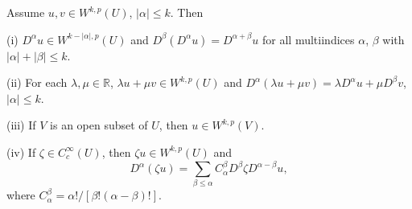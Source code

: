 \begin{theorem}
Assume $u,v\in W^{k,p}(U)$, $|\alpha|\le k$. Then \par
(i) $D^\alpha u\in W^{k-|\alpha|,p}(U)$ and $D^{\beta}(D^{\alpha}u)=D^{\alpha+\beta}u$ for all multiindices $\alpha$, $\beta$ with $|\alpha|+|\beta|\le k$.\par
(ii) For each $\lambda,\mu\in\mathbb{R}$, $\lambda u+\mu v\in W^{k,p}(U)$ and $D^{\alpha}(\lambda u+\mu v)=\lambda D^{\alpha}u+\mu D^{\beta}v$, $|\alpha|\le k$.\par
(iii) If $V$ is an open subset of $U$, then $u\in W^{k,p}(V)$.\par
(iv) If $\zeta\in C_c^\infty(U)$, then $\zeta u\in W^{k,p}(U)$ and 
$$
D^{\alpha}\left( \zeta u \right) =\sum_{\beta \le \alpha}{C_{\alpha}^{\beta}D^{\beta}\zeta D^{\alpha -\beta}u},
$$
where $C_{\alpha}^{\beta}=\alpha !/\left[ \beta !\left( \alpha -\beta \right) ! \right] $.
\end{theorem}
